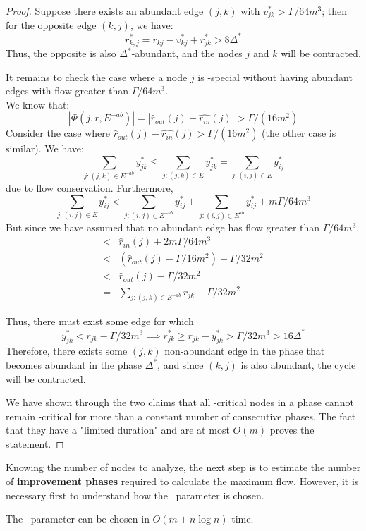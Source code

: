 \begin{proof}
    Suppose there exists an abundant edge \( (j,k) \) with \( v_{jk}^* > \Gamma/64m^3 \); then for the opposite edge \( (k,j) \), we have:
    \[
    r^*_{k,j}= r_{kj}-v^*_{kj}+r^*_{jk}> 8\Delta^*
    \]
    Thus, the opposite is also \( \Delta^* \)-abundant, and the nodes \( j \) and \( k \) will be contracted.

    It remains to check the case where a node \( j \) is \gmm-special without having abundant edges with flow greater than \( \Gamma/64m^3 \).\\
    We know that:
    \[
    |\Phi (j, r, E^{-ab})| = |\hat{r}_{out}(j)-\hat{r_{in}}(j)|> \Gamma/(16m^2)
    \]
    Consider the case where \( \hat{r}_{out}(j)-\hat{r_{in}}(j)> \Gamma/(16m^2) \) (the other case is similar). We have:
    \[
    \sum_{j:(j,k)\in E^{-ab}}y^*_{jk} \le \sum_{j:(j,k)\in E}y^*_{jk} = \sum_{j:(i,j)\in E}y^*_{ij}
    \]
    due to flow conservation. Furthermore, 
    \[
    \sum_{j:(i,j)\in E}y^*_{ij} < \sum_{j:(i,j)\in E^{-ab}}y^*_{ij} + \sum_{j:(i,j)\in E^{ab}}y^*_{ij}+ m\Gamma/64m^3
    \]
    But since we have assumed that no abundant edge has flow greater than \( \Gamma/64m^3 \),
    \[
    \begin{array}{rl}
        < & \hat{r}_{in}(j) + 2m\Gamma/64m^3\\
        < & (\hat{r}_{out}(j) - \Gamma/16m^2) + \Gamma/32m^2\\
        < & \hat{r}_{out}(j) - \Gamma/32m^2\\
        = & \sum_{j:(j,k)\in E^{-ab}}r_{jk} - \Gamma/32m^2
    \end{array}
    \]

    Thus, there must exist some edge for which 
    \[
    y^*_{jk}<r_{jk}-\Gamma/32m^3 \implies r^*_{jk}\ge r_{jk}-y^*_{jk}>\Gamma/32m^3>16\Delta^*
    \]
    Therefore, there exists some \( (j,k) \) non-abundant edge in the \dlt phase that becomes abundant in the phase \( \Delta^* \), and since \( (k,j) \) is also abundant, the cycle will be contracted. \QED

    We have shown through the two claims that all \gmm-critical nodes in a phase cannot remain \gmm-critical for more than a constant number of consecutive phases. The fact that they have a "limited duration" and are at most \( O(m) \) proves the statement.
\end{proof}

Knowing the number of nodes to analyze, the next step is to estimate the number of \textbf{improvement phases} required to calculate the maximum flow. However, it is necessary first to understand how the \gmm\ parameter is chosen.
\newpage
\begin{lemma}
    \label{gammchose}
    The \gmm\ parameter can be chosen in \( O(m+n\log n) \) time.
\end{lemma}

